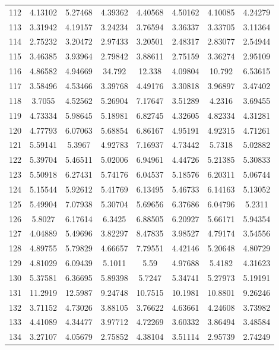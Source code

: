 \begin{center}
\begin{longtable}{cccccccc}
112 & 4.13102 & 5.27468 & 4.39362 & 4.40568 & 4.50162 & 4.10085 & 4.24279\\
113 & 3.31942 & 4.19157 & 3.24234 & 3.76594 & 3.36337 & 3.33705 & 3.11364\\
114 & 2.75232 & 3.20472 & 2.97433 & 3.20501 & 2.48317 & 2.83077 & 2.54944\\
115 & 3.46385 & 3.93964 & 2.79842 & 3.88611 & 2.75159 & 3.36274 & 2.95109\\
116 & 4.86582 & 4.94669 & 34.792 & 12.338 & 4.09804 & 10.792 & 6.53615\\
117 & 3.58496 & 4.53466 & 3.39768 & 4.49176 & 3.30818 & 3.96897 & 3.47402\\
118 & 3.7055 & 4.52562 & 5.26904 & 7.17647 & 3.51289 & 4.2316 & 3.69455\\
119 & 4.73334 & 5.98645 & 5.18981 & 6.82745 & 4.32605 & 4.82334 & 4.31281\\
120 & 4.77793 & 6.07063 & 5.68854 & 6.86167 & 4.95191 & 4.92315 & 4.71261\\
121 & 5.59141 & 5.3967 & 4.92783 & 7.16937 & 4.73442 & 5.7318 & 5.02882\\
122 & 5.39704 & 5.46511 & 5.02006 & 6.94961 & 4.44726 & 5.21385 & 5.30833\\
123 & 5.50918 & 6.27431 & 5.74176 & 6.04537 & 5.18576 & 6.20311 & 5.06744\\
124 & 5.15544 & 5.92612 & 5.41769 & 6.13495 & 5.46733 & 6.14163 & 5.13052\\
125 & 5.49904 & 7.07938 & 5.30704 & 5.69656 & 6.37686 & 6.04796 & 5.2311\\
126 & 5.8027 & 6.17614 & 6.3425 & 6.88505 & 6.20927 & 5.66171 & 5.94354\\
127 & 4.04889 & 5.49696 & 3.82297 & 8.47835 & 3.98527 & 4.79174 & 3.54556\\
128 & 4.89755 & 5.79829 & 4.66657 & 7.79551 & 4.42146 & 5.20648 & 4.80729\\
129 & 4.81029 & 6.09439 & 5.1011 & 5.59 & 4.97688 & 5.4182 & 4.31623\\
130 & 5.37581 & 6.36695 & 5.89398 & 5.7247 & 5.34741 & 5.27973 & 5.19191\\
131 & 11.2919 & 12.5987 & 9.24748 & 10.7515 & 10.1981 & 10.8801 & 9.26246\\
132 & 3.71152 & 4.73026 & 3.88105 & 3.76622 & 4.63661 & 4.24608 & 3.73982\\
133 & 4.41089 & 4.34477 & 3.97712 & 4.72269 & 3.60332 & 3.86494 & 3.48584\\
134 & 3.27107 & 4.05679 & 2.75852 & 4.38104 & 3.51114 & 2.95739 & 2.74249\\

\end{longtable}
\end{center}

